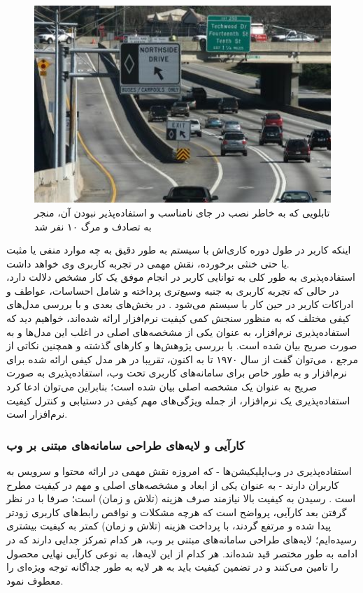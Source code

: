 \begin{figure}[H]
	\centering\includegraphics[width=14.8cm]{Resources/tabloo.JPG}
	\caption{تابلویی که به خاطر نصب در جای نامناسب و استفاده‌پذیر نبودن آن، منجر به تصادف و مرگ ۱۰ نفر شد
		\cite{noauthor_bluffton_2018}
	}
	\label{fig:bluffton}
\end{figure}
 اینکه کاربر در طول دوره کاری‌اش با سیستم به طور دقیق به چه موارد منفی یا مثبت یا حتی خنثی برخورده، نقش مهمی در تجربه کاربری وی خواهد داشت.\\
 استفاده‌پذیری به طور کلی به توانایی کاربر در انجام موفق یک کار مشخص دلالت دارد، در حالی که تجربه کاربری به جنبه وسیع‌تری پرداخته و شامل احساسات، عواطف و ادراکات کاربر در حین کار با سیستم می‌شود
 \cite{albert_measuring_2013}.
 در بخش‌های بعدی و با بررسی مدل‌های کیفی مختلف که به منظور سنجش کمی کیفیت نرم‌افزار ارائه شده‌اند، خواهیم دید که استفاده‌پذیری نرم‌افزار، به عنوان یکی از مشخصه‌های اصلی در اغلب این مدل‌ها و به صورت صریح  بیان شده است. با بررسی پژوهش‌ها و کارهای گذشته و همچنین نکاتی از مرجع
 \cite{pressman_software_2015}،
 می‌توان گفت از سال ۱۹۷۰ تا به اکنون، تقریبا در هر مدل کیفی ارائه شده برای نرم‌افزار و به طور خاص برای سامانه‌های کاربری تحت وب، استفاده‌پذیری به صورت صریح به عنوان یک مشخصه اصلی بیان شده است؛ بنابراین می‌توان ادعا کرد استفاده‌پذیری یک نرم‌افزار، از جمله ویژگی‌های مهم کیفی در دستیابی و کنترل کیفیت نرم‌افزار است.
 \subsubsection{کارآیی و لایه‌های طراحی سامانه‌های مبتنی بر وب}
 استفاده‌پذیری در وب‌اپلیکیشن‌ها - که امروزه نقش مهمی در ارائه محتوا و سرویس به کاربران دارند - به عنوان یکی از ابعاد و مشخصه‌های اصلی و مهم در کیفیت مطرح است
 \cite{pressman_software_2015}.
رسیدن به کیفیت بالا نیازمند صرف هزینه (تلاش و زمان) است؛ صرفا با در نظر گرفتن بعد کارآیی، پرواضح است که هرچه مشکلات و نواقص رابط‌های کاربری زودتر پیدا شده و مرتفع گردند، با پرداخت هزینه (تلاش و زمان) کمتر به کیفیت بیشتری رسیده‌ایم؛ لایه‌های طراحی سامانه‌های مبتنی بر وب، هر کدام تمرکز جدایی دارند که در ادامه به طور مختصر قید شده‌اند. هر کدام از این لایه‌ها، به نوعی کارآیی نهایی محصول را تامین می‌کنند و در تضمین کیفیت باید به هر لایه به طور جداگانه توجه ویژه‌ای را معطوف نمود.
